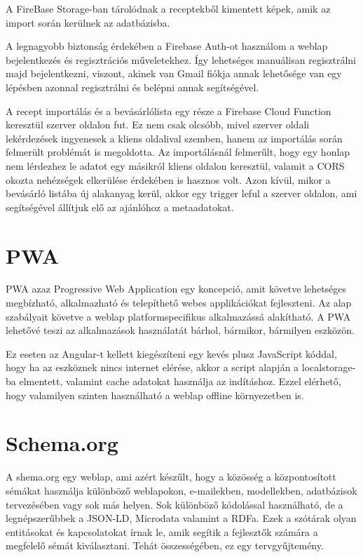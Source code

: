 \documentclass[12pt]{report}
\theoremstyle{definition}
\begin{document}
A FireBase Storage-ban tárolódnak a receptekből kimentett képek, amik az import során kerülnek az adatbázisba.

A legnagyobb biztonság érdekében a Firebase Auth-ot használom a weblap bejelentkezés és regisztrációs műveletekhez. Így lehetséges manuálisan regisztrálni majd bejelentkezni, viszont, akinek van Gmail fiókja annak lehetősége van egy lépésben azonnal regisztrálni és belépni annak segítségével.

A recept importálás és a bevásárlólista egy része a Firebase Cloud Function keresztül szerver oldalon fut. Ez nem csak olcsóbb, mivel szerver oldali lekérdezések ingyenesek a kliens oldalival szemben, hanem az importálás során felmerült problémát is megoldotta. Az importálásnál felmerűlt, hogy egy honlap nem lérdezhez le adatot egy másikról kliens oldalon keresztül, valamit a CORS okozta nehézségek elkerülése érdekében is hasznos volt. Azon kívül, mikor a bevásárló listába új alakanyag kerül, akkor egy trigger leful a szerver oldalon, ami segítségével állítjuk elő az ajánlóhoz a metaadatokat.

\section{PWA}
PWA azaz Progressive Web Application egy koncepció, amit követve lehetséges megbízható, alkalmazható és telepíthető webes applikációkat fejleszteni. Az alap szabályait követve a weblap platformspecifikus alkalmazássá alakítható. A PWA lehetővé teszi az alkalmazások használatát bárhol, bármikor, bármilyen eszközön. 

Ez eseten az Angular-t kellett kiegészíteni egy kevés plusz JavaScript kóddal, hogy ha az eszköznek nincs internet elérése, akkor a script alapján a localstorage-ba elmentett, valamint cache adatokat használja az indításhoz. Ezzel elérhető, hogy valamilyen szinten használható a weblap offline környezetben is.

\section{Schema.org}
A shema.org egy weblap, ami azért készűlt, hogy a közösség a központosított sémákat használja különböző weblapokon, e-mailekben, modellekben, adatbázisok tervezésében vagy sok más helyen. Sok különböző kódolással használható, de a legnépszerűbbek a JSON-LD, Microdata valamint a RDFa. Ezek a szótárak olyan entitásokat és kapcsolatokat írnak le, amik segítik a fejlesztők számára a megfelelő sémát kiválasztani. Tehát összességében, ez egy tervgyűjtemény.
\end{document}
